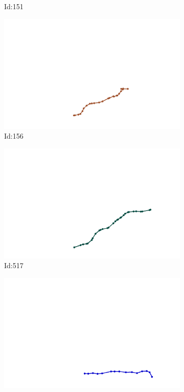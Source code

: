 \documentclass[12pt,twoside]{report}
\begin{document}
\begin{figure}
\begin{subfigure}[b]{0.20\textwidth}
\caption{Id:151}
\end{subfigure}
\begin{subfigure}[b]{0.20\textwidth}
\centering
\includegraphics[width=\textwidth]{../../trajectories/156.png}
\caption{Id:156}
\end{subfigure}
\begin{subfigure}[b]{0.20\textwidth}
\centering
\includegraphics[width=\textwidth]{../../trajectories/517.png}
\caption{Id:517}
\end{subfigure}
\begin{subfigure}[b]{0.20\textwidth}
\centering
\includegraphics[width=\textwidth]{../../trajectories/791.png}

\end{subfigure}
\end{figure}
\end{document}
